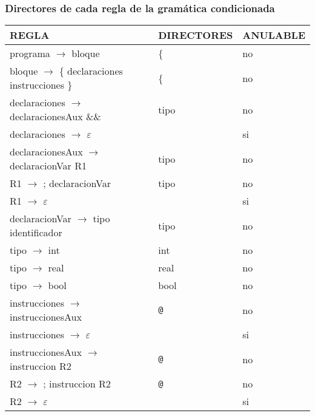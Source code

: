 \documentclass[11pt]{article}
\begin{document}
            \subsubsection{Directores de cada regla de la gramática condicionada}
            \begin{longtable}{|p{6cm}|p{4cm}|p{3cm}|}
                \hline
                \textbf{REGLA} & \textbf{DIRECTORES} & \textbf{ANULABLE} \\
                \hline
                programa $\rightarrow$ bloque & \{ & no \\
                \hline
                bloque $\rightarrow$ \{ declaraciones instrucciones \} & \{ & no \\
                \hline
                declaraciones $\rightarrow$ declaracionesAux \&\& & tipo & no \\
                \hline
                declaraciones $\rightarrow$ $\varepsilon$ & & si \\
                \hline
                declaracionesAux $\rightarrow$ declaracionVar R1 & tipo & no \\
                \hline
                R1 $\rightarrow$ ; declaracionVar & tipo & no \\
                \hline
                R1 $\rightarrow$ $\varepsilon$ &  & si \\
                \hline
                declaracionVar  $\rightarrow$ tipo identificador & tipo & no \\
                \hline
                tipo $\rightarrow$ int & int & no \\
                \hline
                tipo $\rightarrow$ real & real & no \\
                \hline
                tipo $\rightarrow$ bool & bool & no \\
                \hline
                instrucciones $\rightarrow$ instruccionesAux & \verb|@| & no \\
                \hline
                instrucciones $\rightarrow$ $\varepsilon$ & & si \\
                \hline
                instruccionesAux $\rightarrow$ instruccion R2 & \verb|@| & no \\
                \hline
                R2 $\rightarrow$ ; instruccion R2 & \verb|@| & no \\
                \hline
                R2 $\rightarrow$ $\varepsilon$ &  & si \\
                \hline

\end{longtable}
\end{document}
